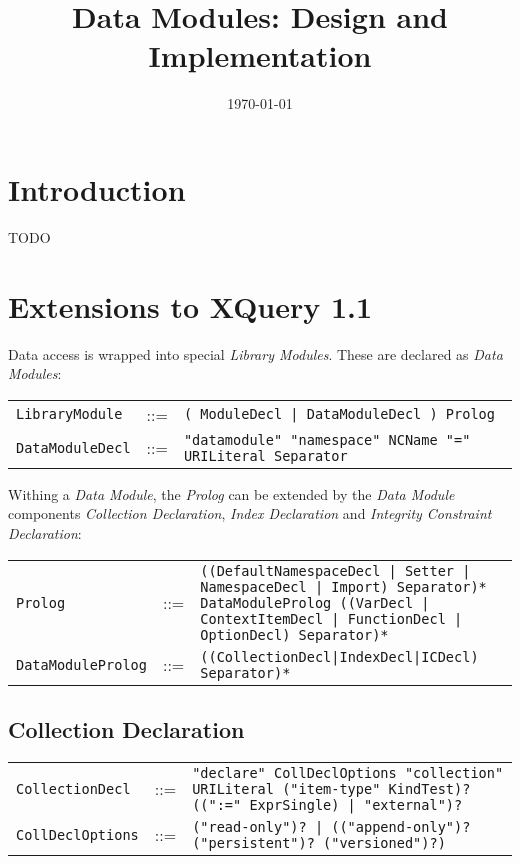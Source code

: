 \documentclass[]{article}
\title{Data Modules: Design and Implementation}
\author{  }
\date{\today}
\begin{document}
\ifpdf
{}
\else
{}
\fi

\maketitle



\section{Introduction}
TODO 


\section{Extensions to XQuery 1.1}
Data access is wrapped into special \textit{Library Modules}. These are declared as \textit{Data Modules}:

\vspace{0.25cm}
\begin{tabular}{l c p{12cm}}
{\tt LibraryModule}  & ::= & {\tt ( ModuleDecl | DataModuleDecl ) Prolog} \\
{\tt DataModuleDecl} & ::= & {\tt "datamodule" "namespace" NCName "=" URILiteral\ Separator}
\end{tabular}

\vspace{0.5cm}
\noindent
Withing a \textit{Data Module}, the \textit{Prolog} can be extended by the \textit{Data Module} components \textit{Collection Declaration}, \textit{Index Declaration} and \textit{Integrity Constraint Declaration}:
\par
\vspace{0.25cm}
\begin{tabular}{l c p{12cm}}
{\tt Prolog}           & ::= & {\tt ((DefaultNamespaceDecl | Setter | NamespaceDecl | Import) Separator)* DataModuleProlog ((VarDecl | ContextItemDecl | FunctionDecl | OptionDecl) Separator)*} \\
{\tt DataModuleProlog} & ::= & {\tt ((CollectionDecl|IndexDecl|ICDecl) Separator)*} 
\end{tabular}

\subsection{Collection Declaration}
\begin{tabular}{l c p{12cm}}
{\tt CollectionDecl}  & ::= & {\tt "declare" CollDeclOptions "collection" URILiteral ("item-type" KindTest)? ((":=" ExprSingle) | "external")?} \\
{\tt CollDeclOptions} & ::= & {\tt ("read-only")? | (("append-only")? ("persistent")? ("versioned")?)  }
\end{tabular}
\end{document}
